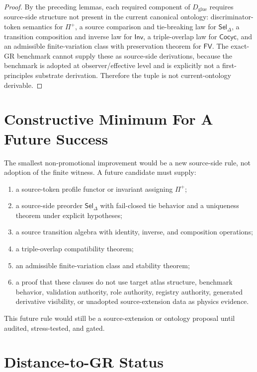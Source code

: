 \documentclass[11pt]{article}
\newcommand{\Prof}{\Pi^{+}}
\newcommand{\Sel}{\mathsf{Sel}_{\Delta}}
\begin{document}
\begin{proof}
By the preceding lemmas, each required component of \(D_{\mathrm{glue}}\)
requires source-side structure not present in the current canonical ontology:
discriminator-token semantics for \(\Prof\), a source comparison and
tie-breaking law for \(\Sel\), a transition composition and inverse law for
\(\mathsf{Inv}\), a triple-overlap law for \(\mathsf{Cocyc}\), and an
admissible finite-variation class with preservation theorem for
\(\mathsf{FV}\). The exact-GR benchmark cannot supply these as source-side
derivations, because the benchmark is adopted at observer/effective level and
is explicitly not a first-principles substrate derivation. Therefore the
tuple is not current-ontology derivable.
\end{proof}

\section{Constructive Minimum For A Future Success}

The smallest non-promotional improvement would be a new source-side rule,
not adoption of the finite witness. A future candidate must supply:
\begin{enumerate}
  \item a source-token profile functor or invariant assigning \(\Prof\);
  \item a source-side preorder \(\Sel\) with fail-closed tie behavior and a
  uniqueness theorem under explicit hypotheses;
  \item a source transition algebra with identity, inverse, and composition
  operations;
  \item a triple-overlap compatibility theorem;
  \item an admissible finite-variation class and stability theorem;
  \item a proof that these clauses do not use target atlas structure,
  benchmark behavior, validation authority, role authority, registry
  authority, generated derivative visibility, or unadopted source-extension
  data as physics evidence.
\end{enumerate}

This future rule would still be a source-extension or ontology proposal until
audited, stress-tested, and gated.

\section{Distance-to-GR Status}
\end{document}
